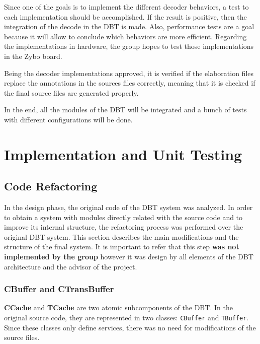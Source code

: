 \documentclass[12pt]{article}
\begin{document}
{Since one of the goals is to implement the different decoder behaviors, a test to each implementation should be accomplished. If the result is positive, then the integration  of the decode in the DBT is made. Also, performance tests are a goal because it will allow to conclude which behaviors are more efficient. Regarding the implementations in hardware, the group hopes to test those implementations in the Zybo board.

Being the decoder implementations approved, it is verified if the elaboration files replace the annotations in the sources files correctly, meaning that it is checked if the final source files are generated properly.

In the end, all the modules of the DBT will be integrated and a bunch of tests with different configurations will be done.


\newpage
\section{Implementation and Unit Testing}


\subsection{Code Refactoring}
In the design phase, the original code of the DBT system was analyzed. In order to obtain a system with modules directly related with the source code and to improve its internal structure, the refactoring process was performed over the original DBT system. This section describes the main modifications and the structure of the final system. It is important to refer that this step \textbf{was not implemented by the group} however it was design by all elements of the DBT architecture and the advisor of the project.


\subsubsection*{CBuffer and CTransBuffer}

\textbf{CCache} and \textbf{TCache} are two atomic subcomponents of the DBT. In the original source code, they are represented in two classes: \texttt{CBuffer} and \texttt{TBuffer}. Since these classes only define services, there was no need for modifications of the source files.

}
\end{document}
